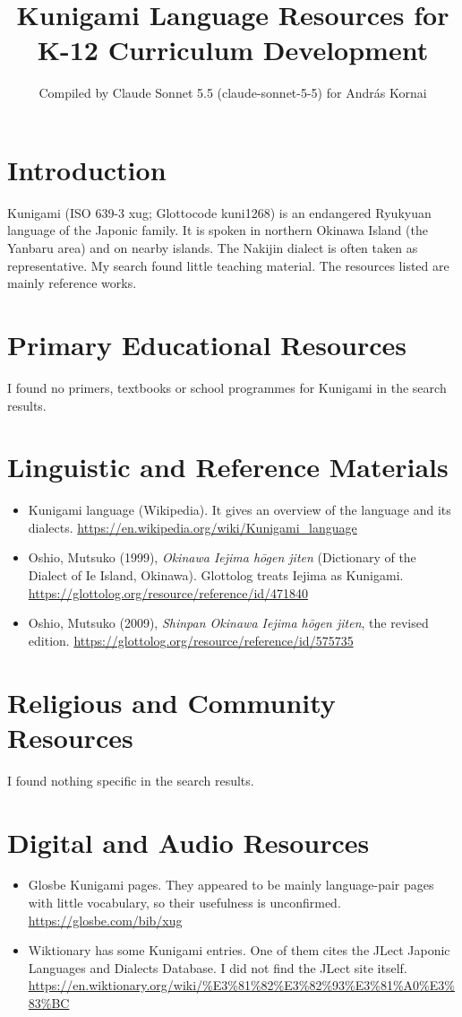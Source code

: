 \documentclass[12pt]{article}
\title{Kunigami Language Resources for K-12 Curriculum Development}
\author{Compiled by Claude Sonnet 5.5 (claude-sonnet-5-5) for Andr\'as Kornai}
\date{}
\begin{document}
\maketitle

\section{Introduction}
Kunigami (ISO 639-3 xug; Glottocode kuni1268) is an endangered Ryukyuan language of the Japonic family. It is spoken in northern Okinawa Island (the Yanbaru area) and on nearby islands. The Nakijin dialect is often taken as representative. My search found little teaching material. The resources listed are mainly reference works.

\section{Primary Educational Resources}
I found no primers, textbooks or school programmes for Kunigami in the search results.

\section{Linguistic and Reference Materials}
\begin{itemize}
\item Kunigami language (Wikipedia). It gives an overview of the language and its dialects. \url{https://en.wikipedia.org/wiki/Kunigami_language}
\item Oshio, Mutsuko (1999), \emph{Okinawa Iejima h\=ogen jiten} (Dictionary of the Dialect of Ie Island, Okinawa). Glottolog treats Iejima as Kunigami. \url{https://glottolog.org/resource/reference/id/471840}
\item Oshio, Mutsuko (2009), \emph{Shinpan Okinawa Iejima h\=ogen jiten}, the revised edition. \url{https://glottolog.org/resource/reference/id/575735}
\end{itemize}

\section{Religious and Community Resources}
I found nothing specific in the search results.

\section{Digital and Audio Resources}
\begin{itemize}
\item Glosbe Kunigami pages. They appeared to be mainly language-pair pages with little vocabulary, so their usefulness is unconfirmed. \url{https://glosbe.com/bib/xug}
\item Wiktionary has some Kunigami entries. One of them cites the JLect Japonic Languages and Dialects Database. I did not find the JLect site itself. \url{https://en.wiktionary.org/wiki/%E3%81%82%E3%82%93%E3%81%A0%E3%83%BC}
\end{itemize}
\end{document}
